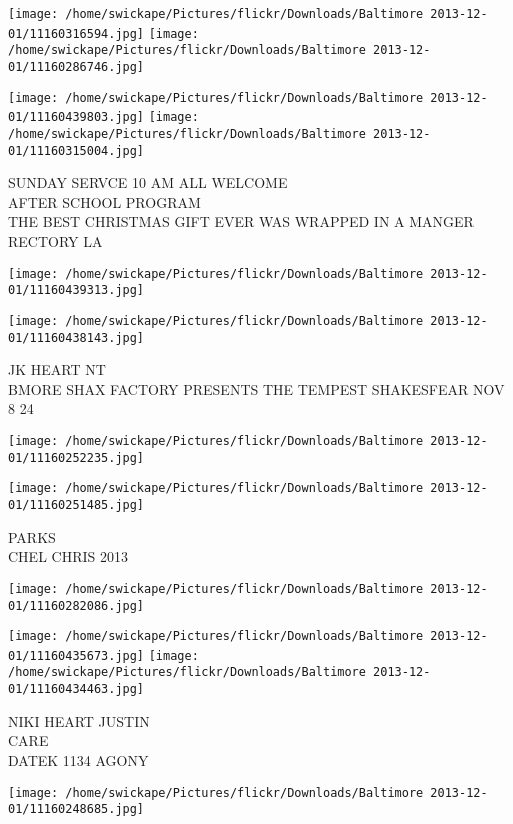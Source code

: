 \documentclass[10pt,letterpaper]{article}
\begin{document}
\texttt{[image: /home/swickape/Pictures/flickr/Downloads/Baltimore 2013-12-01/11160316594.jpg]}
\texttt{[image: /home/swickape/Pictures/flickr/Downloads/Baltimore 2013-12-01/11160286746.jpg]}

\texttt{[image: /home/swickape/Pictures/flickr/Downloads/Baltimore 2013-12-01/11160439803.jpg]}
\texttt{[image: /home/swickape/Pictures/flickr/Downloads/Baltimore 2013-12-01/11160315004.jpg]}

SUNDAY SERVCE 10 AM ALL WELCOME\\
AFTER SCHOOL PROGRAM\\
THE BEST CHRISTMAS GIFT EVER WAS WRAPPED IN A MANGER\\
RECTORY LA
\pagebreak

\texttt{[image: /home/swickape/Pictures/flickr/Downloads/Baltimore 2013-12-01/11160439313.jpg]}

\vspace{0.25in}
\texttt{[image: /home/swickape/Pictures/flickr/Downloads/Baltimore 2013-12-01/11160438143.jpg]}

JK HEART NT\\
BMORE SHAX FACTORY PRESENTS THE TEMPEST SHAKESFEAR NOV 8 24
\pagebreak

\texttt{[image: /home/swickape/Pictures/flickr/Downloads/Baltimore 2013-12-01/11160252235.jpg]}

\vspace{0.25in}
\texttt{[image: /home/swickape/Pictures/flickr/Downloads/Baltimore 2013-12-01/11160251485.jpg]}

PARKS\\
CHEL CHRIS 2013
\pagebreak

\texttt{[image: /home/swickape/Pictures/flickr/Downloads/Baltimore 2013-12-01/11160282086.jpg]}

\vspace{0.25in}
\texttt{[image: /home/swickape/Pictures/flickr/Downloads/Baltimore 2013-12-01/11160435673.jpg]}
\texttt{[image: /home/swickape/Pictures/flickr/Downloads/Baltimore 2013-12-01/11160434463.jpg]}

NIKI HEART JUSTIN\\
CARE\\
DATEK 1134 AGONY
\pagebreak

\texttt{[image: /home/swickape/Pictures/flickr/Downloads/Baltimore 2013-12-01/11160248685.jpg]}
\end{document}
